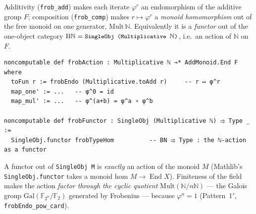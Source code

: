 \documentclass[11pt]{article}
\newcommand{\lc}[1]{\texttt{\small #1}}
\newcommand{\Nn}{\mathbb{N}}
\newcommand{\Fq}{\mathbb{F}_{2^{n}}}
\newcommand{\End}{\operatorname{End}}
\newcommand{\B}{\mathrm{B}}
\begin{document}
Additivity (\lc{frob\_add}) makes each iterate $\varphi^{r}$ an endomorphism of
the additive group $F$; composition (\lc{frob\_comp}) makes
$r\mapsto\varphi^{r}$ a \emph{monoid homomorphism} out of the free monoid on one
generator, $\mathrm{Mult}\,\Nn$. Equivalently it is a \emph{functor} out of the
one-object category $\B\Nn=\lc{SingleObj (Multiplicative }\Nn\lc{)}$, i.e.\ an
action of $\Nn$ on $F$.

\begin{center}
\end{center}

\begin{lstlisting}
noncomputable def frobAction : Multiplicative ℕ →* AddMonoid.End F where
  toFun r := frobEndo (Multiplicative.toAdd r)     -- r ↦ φ^r
  map_one' := ...   -- φ^0 = id
  map_mul' := ...   -- φ^(a+b) = φ^a ∘ φ^b

noncomputable def frobFunctor : SingleObj (Multiplicative ℕ) ⥤ Type _ :=
  SingleObj.functor frobTypeHom          -- BN ⥤ Type : the ℕ-action as a functor
\end{lstlisting}

\begin{note}
A functor out of \lc{SingleObj M} is \emph{exactly} an action of the monoid $M$
(Mathlib's \lc{SingleObj.functor} takes a monoid hom $M\to\End X$). Finiteness
of the field makes the action \emph{factor through the cyclic quotient}
$\mathrm{Mult}(\Nn/n\Nn)$ --- the Galois group $\mathrm{Gal}(\Fq/\mathbb{F}_2)$
generated by Frobenius --- because $\varphi^{n}=1$ (Pattern~1$'$, \lc{frobEndo\_pow\_card}).
\end{note}
\end{document}
